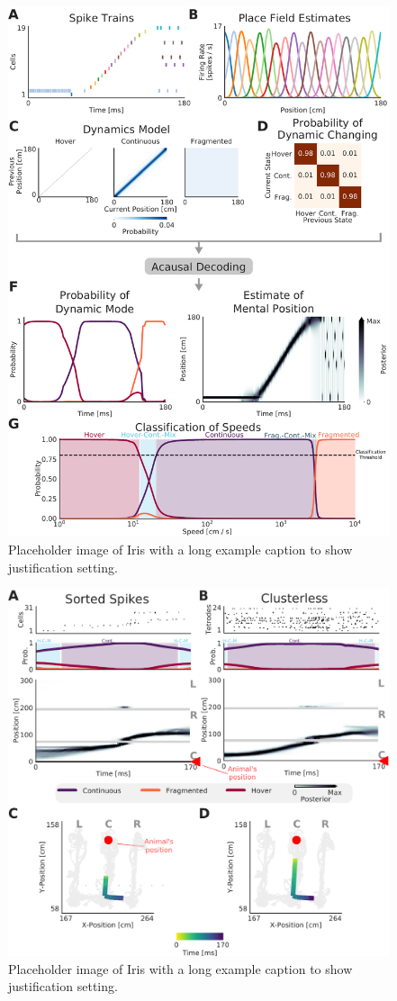 \documentclass[times, twoside]{zHenriquesLab-StyleBioRxiv}
\begin{document}
\begin{figure}%
\centering
\includegraphics[width=0.80\linewidth]{figures/Figure1/Figure1_v3.pdf}
\caption{Placeholder image of Iris with a long example caption to show justification setting.}
\label{Figure1}
\end{figure}

\begin{figure}%
\centering
\includegraphics[width=0.80\linewidth]{figures/Figure2/Figure2_v3}
\caption{Placeholder image of Iris with a long example caption to show justification setting.}
\label{Figure2}
\end{figure}
\end{document}

